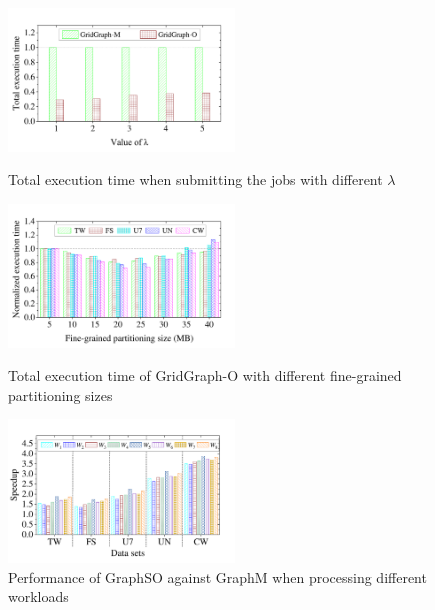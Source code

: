 \documentclass[10pt,journal,compsoc]{IEEEtran}
\begin{document}
\begin{figure}[t]
	\begin{minipage}[t]{0.31\textwidth}
	\centering
	\includegraphics[width=6cm]{Scal_lambda.pdf}
	\vspace{-0.98cm}
	\caption{Total execution time when submitting the jobs with different $\lambda$}
	\label{Scal_lambda}
	\end{minipage}
	\hfill	
	\begin{minipage}[t]{0.31\textwidth}
	\centering
	\includegraphics[width=6cm]{Partitioning-size.pdf}
	\vspace{-0.98cm}
	\caption{Total execution time of GridGraph-O with different fine-grained partitioning sizes}
	\label{Partitioning-size}
	\end{minipage}
    \hfill
	\begin{minipage}[t]{0.31\textwidth}
	\centering
	\includegraphics[width=6cm]{Diff-workloads.pdf}
	\vspace{-0.98cm}
	\caption{Performance of GraphSO against GraphM when processing different workloads}
	\label{Diff-workloads}
	\end{minipage}
	\vspace{-0.6cm}
\end{figure}
\end{document}
